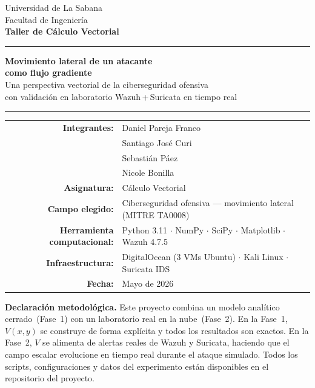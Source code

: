 \documentclass[12pt,a4paper]{article}
\begin{document}
\thispagestyle{empty}

\begin{center}
  Universidad de La Sabana\\
  Facultad de Ingeniería\\[4pt]
  \textbf{Taller de Cálculo Vectorial}
\end{center}
\noindent\rule{\linewidth}{0.8pt}
\begin{center}
  \vspace{6pt}
  {\LARGE\bfseries Movimiento lateral de un atacante\\[4pt]
  como flujo gradiente}\\[8pt]
  {\normalsize Una perspectiva vectorial de la ciberseguridad ofensiva\\
  con validación en laboratorio Wazuh\,+\,Suricata en tiempo real}
  \vspace{4pt}
\end{center}
\noindent\rule{\linewidth}{0.8pt}
\vspace{1.2cm}
\begin{center}
\begin{tabular}{rl}
  \textbf{Integrantes:}  & Daniel Pareja Franco \\
                         & Santiago José Curi \\
                         & Sebastián Páez \\
                         & Nicole Bonilla \\[6pt]
  \textbf{Asignatura:}   & Cálculo Vectorial \\[3pt]
  \textbf{Campo elegido:}& Ciberseguridad ofensiva --- movimiento lateral (MITRE TA0008) \\[3pt]
  \textbf{Herramienta computacional:} &
    Python 3.11 $\cdot$ NumPy $\cdot$ SciPy $\cdot$ Matplotlib $\cdot$ Wazuh 4.7.5 \\[3pt]
  \textbf{Infraestructura:} &
    DigitalOcean (3 VMs Ubuntu) $\cdot$ Kali Linux $\cdot$ Suricata IDS \\[3pt]
  \textbf{Fecha:} & Mayo de 2026
\end{tabular}
\end{center}
\vfill
\begin{tcolorbox}[defbox]
  \textbf{Declaración metodológica.}
  Este proyecto combina un modelo analítico cerrado~(Fase~1) con un
  laboratorio real en la nube~(Fase~2). En la Fase~1, $V(x,y)$ se
  construye de forma explícita y todos los resultados son exactos.
  En la Fase~2, $V$ se alimenta de alertas reales de Wazuh y Suricata,
  haciendo que el campo escalar evolucione en tiempo real durante el
  ataque simulado. Todos los scripts, configuraciones y datos del
  experimento están disponibles en el repositorio del proyecto.
\end{tcolorbox}
\end{document}
